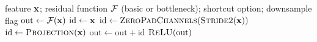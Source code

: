 \begin{algorithm}[t]
\caption{Forward pass of one residual block.}
\label{alg:resblock}
\begin{algorithmic}[1]
\Require feature $\mathbf{x}$; residual function $\mathcal{F}$ (basic or bottleneck);
         shortcut option; downsample flag
\State $\text{out} \gets \mathcal{F}(\mathbf{x})$
   \State $\text{id} \gets \mathbf{x}$ 
\Else
      \State $\text{id} \gets \textsc{ZeroPadChannels}(\textsc{Stride2}(\mathbf{x}))$
   \Else
      \State $\text{id} \gets \textsc{Projection}(\mathbf{x})$
   \EndIf
\EndIf
\State $\text{out} \gets \text{out} + \text{id}$ 
\State \Return $\textsc{ReLU}(\text{out})$
\end{algorithmic}
\end{algorithm}

